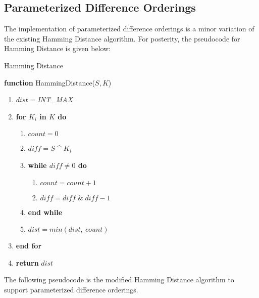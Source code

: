 \documentclass[english]{article}
\begin{document}
\subsection{Parameterized Difference Orderings}

The implementation of parameterized difference orderings is a minor
variation of the existing Hamming Distance algorithm. For posterity,
the pseudocode for Hamming Distance is given below:

\begin{algorithm}[H]
\caption{Hamming Distance}

\textbf{function }HammingDistance($S,K$)
\begin{enumerate}
\item $dist=$\emph{INT\_MAX}
\item \textbf{for $K_{i}$ in $K$ do}
\begin{enumerate}
\item $count=0$
\item $diff=S$ \textasciicircum{} $K_{i}$
\item \textbf{while $diff\neq0$ do}
\begin{enumerate}
\item $count=count+1$
\item $diff=diff\;\&\;diff-1$
\end{enumerate}
\item \textbf{end while}
\item $dist=min(dist,\:count)$
\end{enumerate}
\item \textbf{end for}
\item \textbf{return }$dist$
\end{enumerate}
\end{algorithm}

\noindent The following pseudocode is the modified Hamming Distance
algorithm to support parameterized difference orderings.
\end{document}
